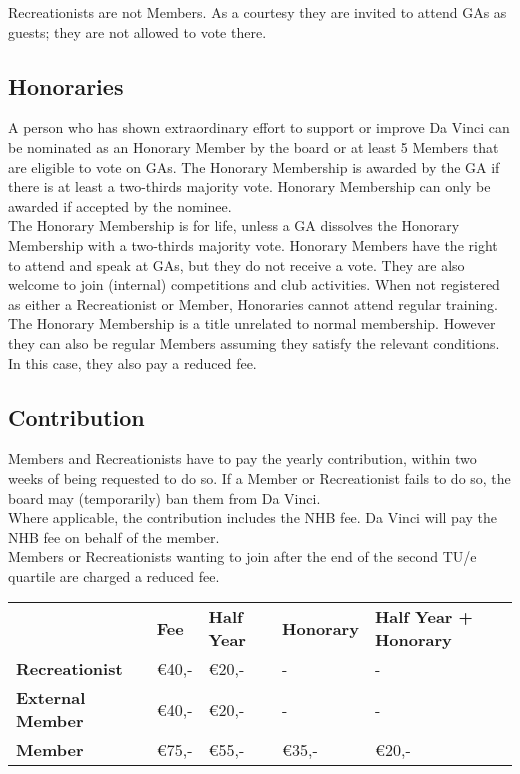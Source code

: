 \documentclass[a4paper]{article}
\begin{document}
Recreationists are not Members. As a courtesy they are invited to attend GAs as guests; they are not allowed to vote there.

\subsection{Honoraries}
A person who has shown extraordinary effort to support or improve Da Vinci can be nominated as an Honorary Member by the board or at least 5 Members that are eligible to vote on GAs.
The Honorary Membership is awarded by the GA if there is at least a two-thirds majority vote. Honorary Membership can only be awarded if accepted by the nominee. \\

The Honorary Membership is for life, unless a GA dissolves the Honorary Membership with a two-thirds majority vote. Honorary Members have the right to attend and speak at GAs, but they do not receive a vote. They are also welcome to join (internal) competitions and club activities. When not registered as either a Recreationist or Member, Honoraries cannot attend regular training. \\

The Honorary Membership is a title unrelated to normal membership. However they can also be regular Members assuming they satisfy the relevant conditions. In this case, they also pay a reduced fee.

\subsection{Contribution}
Members and Recreationists have to pay the yearly contribution, within two weeks of being requested to do so. If a Member or Recreationist fails to do so, the board may (temporarily) ban them from Da Vinci. \\

Where applicable, the contribution includes the NHB fee. Da Vinci will pay the NHB fee on behalf of the member. \\

Members or Recreationists wanting to join after the end of the second TU/e quartile are charged a reduced fee. \\


\bigskip
\begin{tabular}{lllll}
                         & \textbf{Fee} & \textbf{Half Year} & \textbf{Honorary} & \textbf{Half Year + Honorary} \\
\textbf{Recreationist}   & €40,-        & €20,-              & -                 & -                             \\
\textbf{External Member} & €40,-        & €20,-              & -                 & -                             \\
\textbf{Member}          & €75,-        & €55,-              & €35,-             & €20,-                        
\end{tabular}
\end{document}

